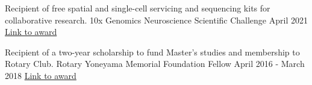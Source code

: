 %
%
%


\vspace*{0.5cm}

\begin{cventries}
    \cventry
        {\textnormal{Recipient of free spatial and single-cell servicing and sequencing kits for collaborative research.}}
        {10x Genomics Neuroscience Scientific Challenge}
        {April 2021}
        {\href{https://www.10xgenomics.com/blog/advancing-neuroscience-with-multidimensional-investigations}{Link to award}}
        {}

    \vspace*{-0.05cm}

    \cventry
        {\textnormal{Recipient of a two-year scholarship to fund Master's studies and membership to Rotary Club.}}
        {Rotary Yoneyama Memorial Foundation Fellow}
        {April 2016 - March 2018}
        {\href{https://hiroorc.org/event/20180215-2/}{Link to award}}
        {}

\end{cventries}

\vspace*{-0.65cm}
